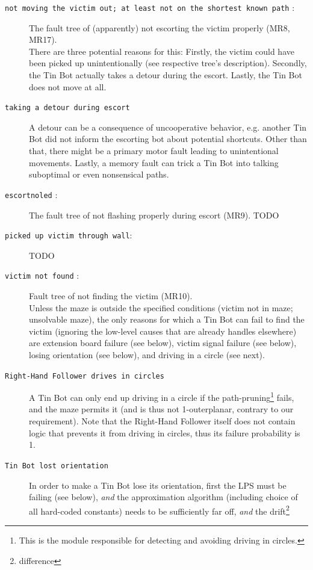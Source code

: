 \documentclass[a4paper,parskip,headheight=38pt]{scrartcl} %
\begin{document}
\begin{description}
\item[\texttt{not moving the victim out; at least not on the shortest known path} :]
    The fault tree of (apparently) not escorting the victim properly
    (MR8, MR17).\\
    There are three potential reasons for this: Firstly, the victim could have been picked up unintentionally (see respective tree's description). Secondly, the Tin Bot actually takes a detour during the escort. Lastly, the Tin Bot does not move at all.
\item[\texttt{taking a detour during escort}]
    A detour can be a consequence of uncooperative behavior, e.g. another Tin Bot did not inform the escorting bot about potential shortcuts. Other than that, there might be a primary motor fault leading to unintentional movements. Lastly, a memory fault can trick a Tin Bot into talking suboptimal or even nonsensical paths.
\item[\texttt{escortnoled} :]
    The fault tree of not flashing properly during escort (MR9). TODO
\item[\texttt{picked up victim through wall}:]
    TODO
\item[\texttt{victim not found} :]
    Fault tree of not finding the victim (MR10).
     \\
    Unless the maze is outside the specified conditions (victim not in
    maze; unsolvable maze), the only reasons for which a Tin Bot can
    fail to find the victim (ignoring the low-level causes that are
    already handles elsewhere) are extension board failure (see below),
    victim signal failure (see below), losing orientation (see below),
    and driving in a circle (see next).
\item[\texttt{Right-Hand Follower drives in circles}]
    A Tin Bot can only end up driving in a circle if the
    path-pruning\footnote{This is the module responsible for detecting
    and avoiding driving in circles.} fails, and the maze permits it
    (and is thus not 1-outerplanar, contrary to our requirement).  Note
    that the Right-Hand Follower itself does not contain logic that
    prevents it from driving in circles, thus its failure probability
    is 1.
\item[\texttt{Tin Bot lost orientation}]
    In order to make a Tin Bot lose its orientation, first the LPS must
    be failing (see below), \emph{and} the approximation algorithm
    (including choice of all hard-coded constants) needs to be
    sufficiently far off, \emph{and} the drift\footnote{difference
}
\end{description}
\end{document}
